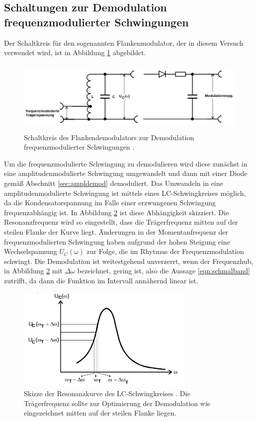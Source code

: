 \subsection{Schaltungen zur Demodulation frequenzmodulierter Schwingungen}

Der Schaltkreis für den sogenannten Flankenmodulator, der in diesem Versuch verwendet wird,
ist in Abbildung \ref{fig:flankendemodulator} abgebildet.

\begin{figure}
  \centering
  \includegraphics[height=3.5cm]{JasperErsterSchultag/flankendemodulator.png}
  \caption{Schaltkreis des Flankendemodulators zur Demodulation frequenzmodulierter Schwingungen \cite{anleitung}.}
  \label{fig:flankendemodulator}
\end{figure}

Um die frequenzmodulierte Schwingung zu demodulieren
wird diese zunächst in eine amplitudenmodulierte Schwingung umgewandelt und dann mit einer Diode gemäß Abschnitt \ref{sec:ampldemod}
demoduliert. Das Umwandeln in eine amplitudenmodulierte Schwingung ist mittels eines LC-Schwingkreises möglich,
da die Kondensatorspannung im Falle einer erzwungenen Schwingung frequenzabhängig ist. In Abbildung
\ref{fig:freqabh} ist diese Abhängigkeit skizziert. Die Resonanzfrequenz wird so eingestellt, dass die Trägerfrequenz
mitten auf der steilen Flanke der Kurve liegt. Änderungen in der Momentanfrequenz der frequenzmodulierten Schwingung
haben aufgrund der hohen Steigung eine Wechselspannung $U_C(\omega)$ zur Folge, die im Rhytmus der Frequenzmodulation
schwingt. Die Demodulation ist weitestgehend unverzerrt, wenn der Frequenzhub, in Abbildung \ref{fig:freqabh} mit
$\Delta \omega$ bezeichnet, gering ist, also die Aussage \eqref{eqn:schmalband} zutrifft, da dann die Funktion im Intervall annähernd linear ist.

\begin{figure}
  \centering
  \includegraphics[height=5cm]{JasperErsterSchultag/freqabh.png}
  \caption{Skizze der Resonanzkurve des LC-Schwingkreises \cite{anleitung}. Die Trägerfrequenz sollte zur Optimierung der Demodulation
  wie eingezeichnet mitten auf der steilen Flanke liegen.}
  \label{fig:freqabh}
\end{figure}

